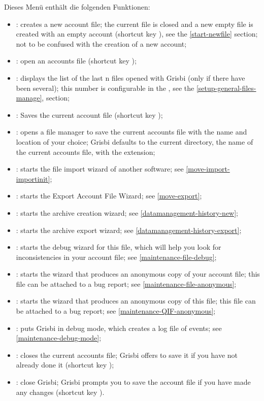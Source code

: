 Dieses Menü enthält die folgenden Funktionen:%
\begin{itemize}
	\item {}: creates a new account file; the current file is closed and a new empty file is created with an empty account (shortcut key ),  see the \vref{start-newfile} section; not to be confused with the creation of a new account;
	\item {}: open an accounts file  (shortcut key  );
	\item {}: displays the list of the last n files opened with Grisbi (only if there have been several); this number is configurable in the , see the \vref{setup-general-files-manage},  section;
	\item {}: Saves the current account file  (shortcut key );
	\item {}: opens a file manager to save the current accounts file with the name and location of your choice; Grisbi defaults to the current directory, the name of the current accounts file, with the  extension;
	\item {}: starts the file import wizard of another software; see  \vref{move-import-importinit};
	\item {}: starts the Export Account File Wizard; see \vref{move-export};	
	\item {}: starts the archive creation wizard; see \vref{datamanagement-history-new};	
	\item {}: starts the archive export wizard; see \vref{datamanagement-history-export};
	\item {}: starts the debug wizard for this file, which will help you look for inconsistencies in your account file; see  \vref{maintenance-file-debug};
	\item {}: starts the wizard that produces an anonymous copy of your account file; this file can be attached to a bug report; see \vref{maintenance-file-anonymous};	
	\item {}: starts the wizard that produces an anonymous copy of this file; this file can be attached to a bug report; see \vref{maintenance-QIF-anonymous};	
	\item {}: puts Grisbi in debug mode, which creates a log file of events; see \vref{maintenance-debug-mode}; 	
	\item {}: closes the current accounts file; Grisbi offers to save it if you have not already done it (shortcut key );
	\item {}: close Grisbi; Grisbi prompts you to save the account file if you have made any changes (shortcut key ).
\end{itemize}


